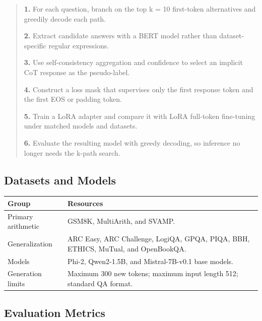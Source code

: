 \documentclass[11pt]{article}
\newcounter{none} %
\begin{document}
\begin{quote}
\textbf{1.} For each question, branch on the top k = 10 first-token
alternatives and greedily decode each path.

\textbf{2.} Extract candidate answers with a BERT model rather than
dataset-specific regular expressions.

\textbf{3.} Use self-consistency aggregation and confidence to select an
implicit CoT response as the pseudo-label.

\textbf{4.} Construct a loss mask that supervises only the first
response token and the first EOS or padding token.

\textbf{5.} Train a LoRA adapter and compare it with LoRA full-token
fine-tuning under matched models and datasets.

\textbf{6.} Evaluate the resulting model with greedy decoding, so
inference no longer needs the k-path search.
\end{quote}

\subsection{Datasets and Models}\label{datasets-and-models}

{\def\LTcaptype{none} %
\begin{longtable}[]{@{}
  >{\raggedright\arraybackslash}p{}
  >{\raggedright\arraybackslash}p{}@{}}
\toprule\noalign{}
\begin{minipage}[b]{\linewidth}\centering
\textbf{Group}
\end{minipage} & \begin{minipage}[b]{\linewidth}\centering
\textbf{Resources}
\end{minipage} \\
\midrule\noalign{}
\endhead
\bottomrule\noalign{}
\endlastfoot
Primary arithmetic & GSM8K, MultiArith, and SVAMP. \\
Generalization & ARC Easy, ARC Challenge, LogiQA, GPQA, PIQA, BBH,
ETHICS, MuTual, and OpenBookQA. \\
Models & Phi-2, Qwen2-1.5B, and Mistral-7B-v0.1 base models. \\
Generation limits & Maximum 300 new tokens; maximum input length 512;
standard QA format. \\
\end{longtable}
}

\subsection{Evaluation Metrics}\label{evaluation-metrics-1}
\end{document}

